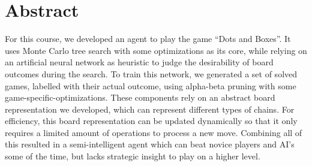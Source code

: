 \section*{Abstract}

For this course, we developed an agent to play the game ``Dots and Boxes''. It uses Monte Carlo tree search with some optimizations as its core, while relying on an artificial neural network as heuristic to judge the desirability of board outcomes during the search. To train this network, we generated a set of solved games, labelled with their actual outcome, using alpha-beta pruning with some game-specific-optimizations. These components rely on an abstract board representation we developed, which can represent different types of chains. For efficiency, this board representation can be updated dynamically so that it only requires a limited amount of operations to process a new move. Combining all of this resulted in a semi-intelligent agent which can beat novice players and AI's some of the time, but lacks strategic insight to play on a higher level.